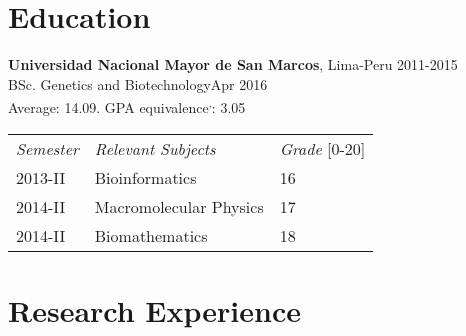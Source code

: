\documentclass[margin,line]{res}
\begin{document}
\begin{resume}

\section{\sc Education}
{\bf Universidad Nacional Mayor de San Marcos}, Lima-Peru \hfill 2011-2015\\%
BSc. Genetics and Biotechnology\hfill Apr 2016\\
Average: 14.09. GPA equivalence\footnotemark\textsuperscript{,}\footnotemark: 3.05\\%

\begin{center}
	\vspace{-9mm}
	\begin{tabular}{lll}
		\textit{Semester} & \textit{Relevant Subjects} & \textit{Grade} [0-20] \\
		2013-II & Bioinformatics & 16\\
		2014-II & Macromolecular Physics & 17\\
		2014-II & Biomathematics & 18\\
	\end{tabular}
	\vspace{1.8mm}
\end{center}


\section{\sc Research Experience}


\end{resume}
\end{document}
